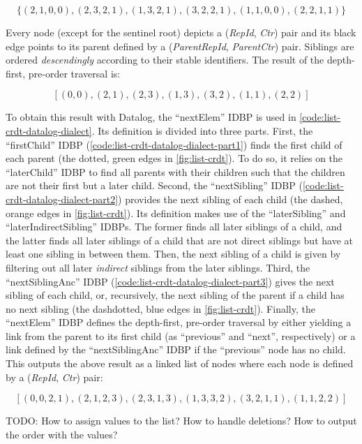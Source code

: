 \[\{ (2,1,0,0), (2,3,2,1), (1,3,2,1), (3,2,2,1), (1,1,0,0), (2,2,1,1) \}\]

Every node (except for the sentinel root) depicts a (\textit{RepId}, \textit{Ctr})
pair and its black edge points to its parent defined by
a (\textit{ParentRepId}, \textit{ParentCtr}) pair.
Siblings are ordered \emph{descendingly} according to their stable identifiers.
The result of the depth-first, pre-order traversal is:

\[[ (0,0), (2,1), (2,3), (1,3), (3,2), (1,1), (2,2) ]\]

To obtain this result with Datalog, the ``nextElem'' \ac{IDBP} is used in
\ref{code:list-crdt-datalog-dialect}.
Its definition is divided into three parts.
First, the ``firstChild'' \ac{IDBP} (\ref{code:list-crdt-datalog-dialect-part1})
finds the first child of each parent
(the dotted, green edges in \ref{fig:list-crdt}).
To do so, it relies on the ``laterChild'' \ac{IDBP} to find all parents with
their children such that the children are not their first but a later child.
Second, the ``nextSibling'' \ac{IDBP} (\ref{code:list-crdt-datalog-dialect-part2})
provides the next sibling of each child
(the dashed, orange edges in \ref{fig:list-crdt}).
Its definition makes use of the ``laterSibling'' and ``laterIndirectSibling''
\acp{IDBP}. The former finds all later siblings of a child, and the latter
finds all later siblings of a child that are not direct siblings but have
at least one sibling in between them.
Then, the next sibling of a child is given by filtering out all later
\emph{indirect} siblings from the later siblings.
Third, the ``nextSiblingAnc'' \ac{IDBP} (\ref{code:list-crdt-datalog-dialect-part3})
gives the next sibling of each child, or, recursively,
the next sibling of the parent if a child has no next sibling
(the dashdotted, blue edges in \ref{fig:list-crdt}).
Finally, the ``nextElem'' \ac{IDBP} defines the depth-first, pre-order traversal
by either yielding a link from the parent to its first child (as ``previous''
and ``next'', respectively) or a link defined by the ``nextSiblingAnc'' \ac{IDBP}
if the ``previous'' node has no child.
This outputs the above result as a linked list of nodes where each node is
defined by a (\textit{RepId}, \textit{Ctr}) pair:

\[[ (0,0,2,1), (2,1,2,3), (2,3,1,3), (1,3,3,2), (3,2,1,1), (1,1,2,2) ]\]

TODO:
How to assign values to the list?
How to handle deletions?
How to output the order with the values?

